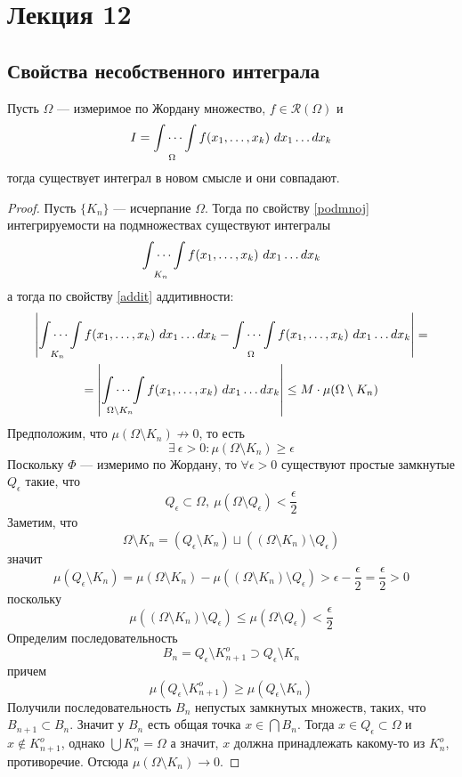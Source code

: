 \section{Лекция 12}
\subsection{Свойства несобственного интеграла}
\begin{statement}
    Пусть $\Omega$ --- измеримое по Жордану множество, $f\in \mathcal{R}(\Omega)$ и
    \[I=\idotsint\limits_{\Omega}f(x_1,\dots,x_k)\ dx_1\dots dx_k\]
    тогда существует интеграл в новом смысле и они совпадают.
\end{statement}
\begin{proof}
    Пусть $\{K_n\}$ --- исчерпание $\Omega$. Тогда по свойству \ref{podmnoj} интегрируемости на подмножествах существуют интегралы
    \[\idotsint\limits_{K_n}f(x_1,\dots,x_k)\ dx_1\dots dx_k\]
    а тогда по свойству \ref{addit} аддитивности:
    \begin{multline*}
        \left|\idotsint\limits_{K_n}f(x_1,\dots,x_k)\ dx_1\dots dx_k-\idotsint\limits_{\Omega}f(x_1,\dots,x_k)\ dx_1\dots dx_k\right|=\\
        =\left|\idotsint\limits_{\Omega\setminus K_n}f(x_1,\dots,x_k)\ dx_1\dots dx_k\right|\leq M\cdot \mu(\Omega\setminus K_n)
    \end{multline*}
    Предположим, что $\mu(\Omega\setminus K_n)\not\to0$, то есть 
    \[\exists\ \epsilon>0: \mu(\Omega\setminus K_n)\geq \epsilon\] 
    Поскольку $\Phi$ --- измеримо по Жордану, то $\forall \epsilon>0$ существуют простые замкнутые $Q_{\epsilon}$ такие, что 
    \[Q_{\epsilon}\subset \Omega,\ \mu(\Omega\setminus Q_{\epsilon})<\frac{\epsilon}{2}\] 
    Заметим, что 
    \[\Omega\setminus K_n=(Q_{\epsilon}\setminus K_n)\sqcup((\Omega\setminus K_n)\setminus Q_{\epsilon})\]
    значит
    \[\mu(Q_{\epsilon}\setminus K_n)=\mu(\Omega\setminus K_n)-\mu((\Omega\setminus K_n)\setminus Q_{\epsilon})> \epsilon-\frac{\epsilon}{2}=\frac{\epsilon}{2}>0\]
    поскольку
    \[\mu((\Omega\setminus K_n)\setminus Q_{\epsilon})\leq \mu(\Omega\setminus Q_{\epsilon})<\frac{\epsilon}{2}\]
    Определим последовательность 
    \[B_n=Q_{\epsilon}\setminus K_{n+1}^o\supset Q_{\epsilon}\setminus K_n\] 
    причем
    \[\mu(Q_{\epsilon}\setminus K_{n+1}^o)\geq\mu(Q_{\epsilon}\setminus K_n)\]
    Получили последовательность $B_n$ непустых замкнутых множеств, таких, что $B_{n+1}\subset B_n$. Значит у $B_n$ есть общая точка $x\in \bigcap\limits B_n$. Тогда $x\in Q_{\epsilon}\subset \Omega$ и $x\not\in K_{n+1}^o$, однако $\bigcup\limits K_n^o=\Omega$ а значит, $x$ должна принадлежать какому-то из $K_n^o$, противоречие. Отсюда $\mu(\Omega\setminus K_n)\to 0$.
\end{proof}
